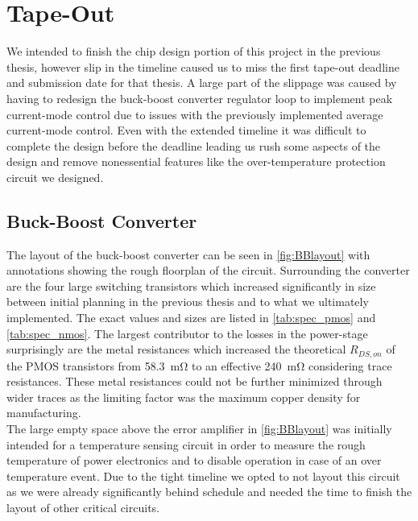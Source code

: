 \section{Tape-Out}
\label{sec:tapout}

We intended to finish the chip design portion of this project in the previous thesis, however slip in the timeline caused us to miss the first tape-out deadline and submission date for that thesis. A large part of the slippage was caused by having to redesign the buck-boost converter regulator loop to implement peak current-mode control due to issues with the previously implemented average current-mode control. Even with the extended timeline it was difficult to complete the design before the deadline leading us rush some aspects of the design and remove nonessential features like the over-temperature protection circuit we designed.

\subsection{Buck-Boost Converter}
The layout of the buck-boost converter can be seen in  \autoref{fig:BBlayout} with annotations showing the rough floorplan of the circuit. Surrounding the converter are the four large switching transistors which increased significantly in size between initial planning in the previous thesis and to what we ultimately implemented. The exact values and sizes are listed in \autoref{tab:spec_pmos} and \autoref{tab:spec_nmos}. The largest contributor to the losses in the power-stage surprisingly are the metal resistances which increased the theoretical $R_{DS,on}$ of the \ac{PMOS} transistors from \qty{58.3}{\milli\ohm} to an effective \qty{240}{\milli\ohm} considering trace resistances. These metal resistances could not be further minimized through wider traces as the limiting factor was the maximum copper density for manufacturing. \\
The large empty space above the error amplifier in \autoref{fig:BBlayout} was initially intended for a temperature sensing circuit in order to measure the rough temperature of power electronics and to disable operation in case of an over temperature event. Due to the tight timeline we opted to not layout this circuit as we were already significantly behind schedule and needed the time to finish the layout of other critical circuits. 

